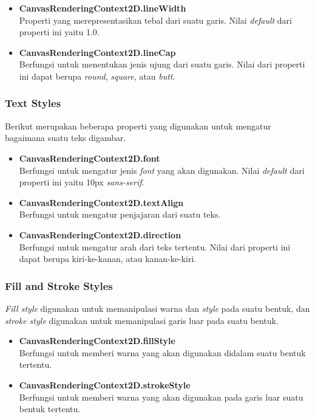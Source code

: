 \begin{itemize}
	\item \textbf{CanvasRenderingContext2D.lineWidth} \\ Properti yang merepresentasikan tebal dari suatu garis. Nilai \textit{default} dari properti ini yaitu 1.0.
	\item \textbf{CanvasRenderingContext2D.lineCap} \\ Berfungsi untuk menentukan jenis ujung dari suatu garis. Nilai dari properti ini dapat berupa \textit{round}, \textit{square}, atau \textit{butt}. 
\end{itemize}

\subsubsection{Text Styles}
Berikut merupakan beberapa properti yang digunakan untuk mengatur bagaimana suatu teks digambar.

\begin{itemize}
	\item \textbf{CanvasRenderingContext2D.font} \\ Berfungsi untuk mengatur jenis \textit{font} yang akan digunakan. Nilai \textit{default} dari properti ini yaitu 10px \textit{sans-serif}.
	\item \textbf{CanvasRenderingContext2D.textAlign} \\ Berfungsi untuk mengatur penjajaran dari suatu teks.
	\item \textbf{CanvasRenderingContext2D.direction} \\  Berfungsi untuk mengatur arah dari teks tertentu. Nilai dari properti ini dapat berupa kiri-ke-kanan, atau kanan-ke-kiri.
\end{itemize}

\subsubsection{Fill and Stroke Styles}
\textit{Fill style} digunakan untuk memanipulasi warna dan \textit{style} pada suatu bentuk, dan \textit{stroke style} digunakan untuk memanipulasi garis luar pada suatu bentuk.

\begin{itemize}
	\item \textbf{CanvasRenderingContext2D.fillStyle} \\ Berfungsi untuk memberi warna yang akan digunakan didalam suatu bentuk tertentu.
	\item \textbf{CanvasRenderingContext2D.strokeStyle} \\ Berfungsi untuk memberi warna yang akan digunakan pada garis luar suatu bentuk tertentu.
\end{itemize}

